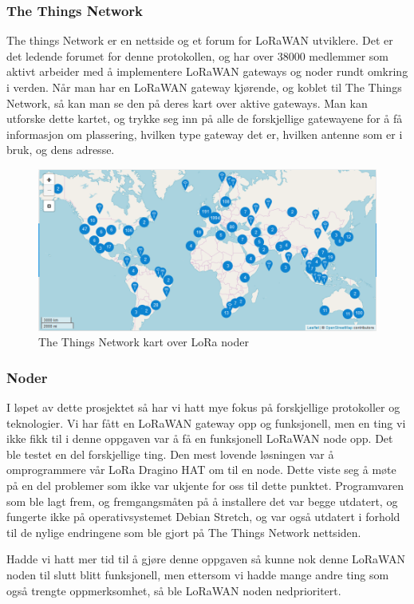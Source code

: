 \documentclass{article}
\begin{document}
\subsubsection{The Things Network}
The things Network er en nettside og et forum for LoRaWAN utviklere. Det er det ledende forumet for denne protokollen, og har over 38000 medlemmer som aktivt arbeider med å implementere LoRaWAN gateways og noder rundt omkring i verden. Når man har en LoRaWAN gateway kjørende, og koblet til The Things Network, så kan man se den på deres kart over aktive gateways. 
Man kan utforske dette kartet, og trykke seg inn på alle de forskjellige gatewayene for å få informasjon om plassering, hvilken type gateway det er, hvilken antenne som er i bruk, og dens adresse. 


\begin{figure} [!ht]
	\centering
		\includegraphics[width=0.75\linewidth]{TTNMap} 
\caption{The Things Network kart over LoRa noder}
\end{figure}

\subsubsection{Noder}
I løpet av dette prosjektet så har vi hatt mye fokus på forskjellige protokoller og teknologier. Vi har fått en LoRaWAN gateway opp og funksjonell, men en ting vi ikke fikk til i denne oppgaven var å få en funksjonell LoRaWAN node opp. Det ble testet en del forskjellige ting. Den mest lovende løsningen var å omprogrammere vår LoRa Dragino HAT om til en node. Dette viste seg å møte på en del problemer som ikke var ukjente for oss til dette punktet. Programvaren som ble lagt frem, og fremgangsmåten på å installere det var begge utdatert, og fungerte ikke på operativsystemet Debian Stretch, og var også utdatert i forhold til de nylige endringene som ble gjort på The Things Network nettsiden. 

Hadde vi hatt mer tid til å gjøre denne oppgaven så kunne nok denne LoRaWAN noden til slutt blitt funksjonell, men ettersom vi hadde mange andre ting som også trengte oppmerksomhet, så ble LoRaWAN noden nedprioritert. 
\end{document}

